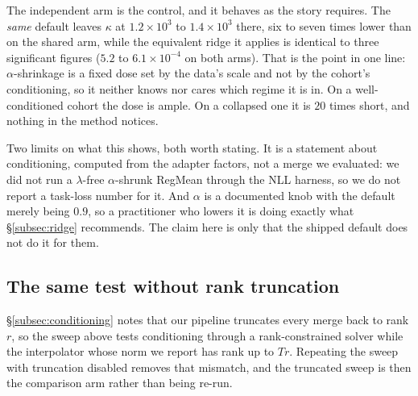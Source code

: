 The independent arm is the control, and it behaves as the story requires. The
\emph{same} default leaves $\kappa$ at $1.2\times10^{3}$ to $1.4\times10^{3}$
there, six to seven times lower than on the shared arm, while the equivalent
ridge it applies is identical to three significant figures
($5.2$ to $6.1\times10^{-4}$ on both arms). That is the point in one line:
$\alpha$-shrinkage is a fixed dose set by the data's scale and not by the
cohort's conditioning, so it neither knows nor cares which regime it is in.
On a well-conditioned cohort the dose is ample. On a collapsed one it is
$20$ times short, and nothing in the method notices.

Two limits on what this shows, both worth stating. It is a statement about
conditioning, computed from the adapter factors, not a merge we evaluated: we
did not run a $\lambda$-free $\alpha$-shrunk RegMean through the NLL harness,
so we do not report a task-loss number for it. And $\alpha$ is a documented
knob with the default merely being $0.9$, so a practitioner who lowers it is
doing exactly what \S\ref{subsec:ridge} recommends. The claim here is only
that the shipped default does not do it for them.

\subsection{The same test without rank truncation}
\label{subsec:untruncated}

\S\ref{subsec:conditioning} notes that our pipeline truncates every merge
back to rank $r$, so the sweep above tests conditioning through a
rank-constrained solver while the interpolator whose norm we report has
rank up to $Tr$. Repeating the sweep with truncation disabled removes that
mismatch, and the truncated sweep is then the comparison arm rather than
being re-run.


